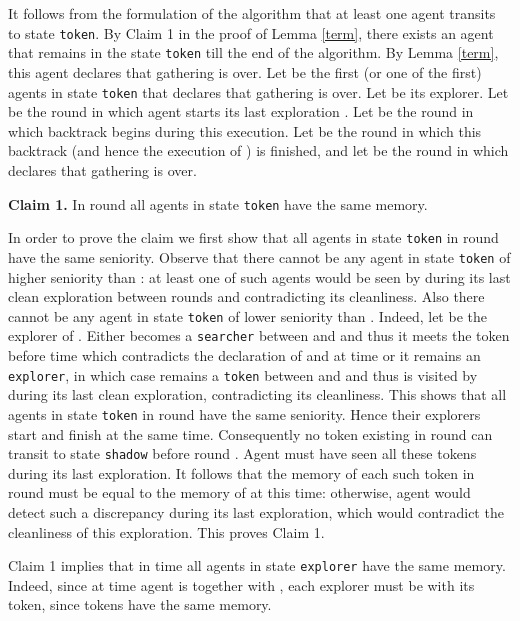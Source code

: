 \documentclass[11pt]{article}
\newcommand{\finclaim}{\hfill }
\newcommand{\qed}{\hfill  \bigbreak}
\newenvironment{proof}{\noindent {\bf Proof.}}{\qed}
\begin{document}
\begin{proof}
It follows from the formulation of the algorithm that at least one agent transits to state {\tt token}. By Claim 1 in the proof of Lemma \ref{term}, 
there exists an agent that remains in the state {\tt token} till the end of the algorithm. By Lemma \ref{term}, this agent declares that gathering is over.
Let  be the first (or one of the first) agents in state {\tt token} that declares that gathering is over. Let  be its explorer. Let  be the round in which
agent  starts its last exploration . Let  be the round in which backtrack begins during this execution. Let  be the round in which
this backtrack (and hence the execution of ) is finished, and let  be the round in which  declares that gathering is over.

\vspace*{0.3cm}
\noindent
{\bf Claim 1.} In round  all agents in state {\tt token} have the same memory.

In order to prove the claim we first show that all agents in state {\tt token} in round  have the same seniority. Observe that there cannot be any agent
in state {\tt token} of higher seniority than : {at least one of such agents} would be seen by  during its last clean exploration  between rounds 
and  contradicting its cleanliness. Also there cannot be any agent  in state {\tt token} of lower seniority than . Indeed, let  be the explorer of .
Either  becomes a {\tt searcher} between  and  and thus it meets the token  before time  which contradicts the
declaration of  and  at time  or it remains an {\tt explorer}, in which case  remains a {\tt token} between  and  and thus  is visited
by  during its last clean exploration,  contradicting its cleanliness. This shows that all agents in state {\tt token} in round  have the same seniority.
Hence their explorers start and finish  at the same time. Consequently no token existing in round  can transit to state {\tt shadow}
before round . Agent  must have seen all these tokens during its last exploration. It follows that the memory of each such token in round  must
be equal to the memory of  at this time: otherwise, agent  would detect such a discrepancy during its last exploration, which would contradict the 
cleanliness of this exploration. This proves Claim 1.\finclaim

Claim 1 implies that in time  all agents in state {\tt explorer} have the same memory. Indeed, since at time  agent  is together with , each explorer
must be with its token, since tokens have the same memory.


\end{proof}
\end{document}
